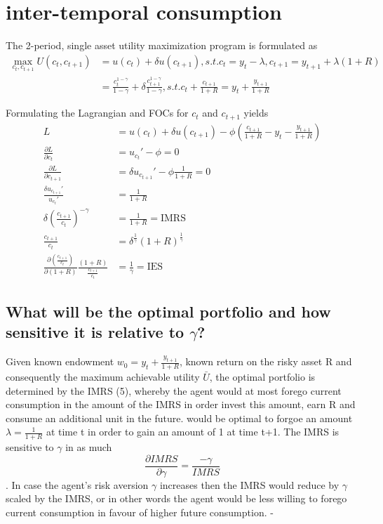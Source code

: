 \documentclass[]{article}
\begin{document}
\section{inter-temporal consumption}
The 2-period, single asset utility maximization program is formulated as
\begin{align*}
	\max_{c_t, c_{t+1}} U(c_t, c_{t+1}) &= u(c_t) + \delta u(c_{t+1}), s.t. c_t = y_t - \lambda, c_{t+1} = y_{t+1} + \lambda (1+R)\\
	&= \frac{c_t^{1-\gamma}}{1-\gamma} + \delta \frac{c_{t+1}^{1-\gamma}}{1-\gamma}, s.t. c_t + \frac{c_{t+1}}{1+R} = y_t + \frac{y_{t+1}}{1+R}
\end{align*}

Formulating the Lagrangian and FOCs for $c_t$ and $c_{t+1}$ yields
\begin{align}
	L &= u(c_t) + \delta u(c_{t+1}) - \phi (\frac{c_{t+1}}{1+R} - y_t - \frac{y_{t+1}}{1+R})\\
	\frac{\partial L}{\partial c_t} &= u_{c_t}' - \phi = 0\\
	\frac{\partial L}{\partial c_{t+1}} &= \delta u_{c_{t+1}}' - \phi \frac{1}{1+R}= 0\\
	\frac{\delta u_{c_{t+1}}'}{u_{c_t}'} &= \frac{1}{1+R}\\
	\delta \left( \frac{c_{t+1}}{c_t} \right)^{-\gamma} &= \frac{1}{1+R} = \text{IMRS}\\
	\frac{c_{t+1}}{c_t} &= \delta^{\frac{1}{\gamma}}(1+R)^{\frac{1}{\gamma}}\\
	\frac{\partial(\frac{c_{t+1}}{c_t})}{\partial(1+R)} \frac{(1+R)}{\frac{c_{t+1}}{c_t}} &= \frac{1}{\gamma} = \text{IES}
\end{align}

\subsection{What will be the optimal portfolio and how sensitive it is relative to $\gamma$?}
Given known endowment $w_0 = y_t + \frac{y_{t+1}}{1+R}$, known return on the risky asset R and consequently the maximum achievable utility $\bar{U}$, the optimal portfolio is determined by the IMRS (5), whereby the agent would at most forego current consumption in the amount of the IMRS in order invest this amount, earn R and consume an additional unit in the future.  would be optimal to forgoe an amount $\lambda = \frac{1}{1+R}$ at time t in order to gain an amount of 1 at time t+1. The IMRS is sensitive to $\gamma$ in as much $$\frac{\partial IMRS}{\partial \gamma} = \frac{-\gamma}{IMRS}$$. In case the agent's risk aversion $\gamma$ increases then the IMRS would reduce by $\gamma$ scaled by the IMRS, or in other words the agent would be less willing to forego current consumption in favour of higher future consumption. -
\end{document}
